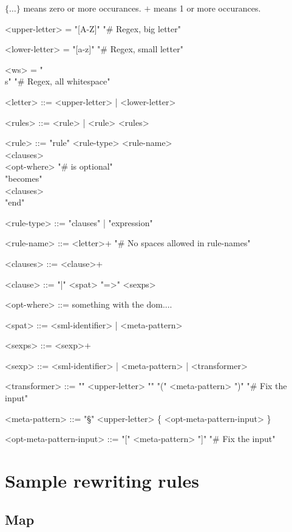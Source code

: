 \documentclass[oneside]{memoir}
\theoremstyle{definition}
\begin{document}
$\{ \ldots \}$ means zero or more occurances.
$+$ means 1 or more occurances.


\setlength{\grammarindent}{7.3em}
\begin{grammar} 
 
  <upper-letter> = "[A-Z]" \hfill "# Regex, big letter"

  <lower-letter> = "[a-z]" \hfill "# Regex, small letter"

  <ws> = "\\s" \hfill "\# Regex, all whitespace"

  <letter> ::= <upper-letter> | <lower-letter>

  <rules> ::= <rule> | <rule> <rules>

  <rule> ::= "rule" <rule-type> <rule-name> \\
             \hspace*{1em} <clauses> \\
             <opt-where> \hfill "\# is optional" \\
             "becomes" \\
             \hspace*{1em} <clauses> \\
             "end"

  <rule-type> ::= "clauses" | "expression" 

  <rule-name> ::= <letter>+ \hfill "\# No spaces allowed in rule-names"

  <clauses> ::= <clause>+

  <clause> ::= "|" <spat> "=>" <sexps>

  <opt-where> ::= something with the dom....

  <spat> ::= <sml-identifier> | <meta-pattern>

  <sexps>  ::= <sexp>+
  
  <sexp>   ::= <sml-identifier> | <meta-pattern> | <transformer>

  <transformer> ::= "{" <upper-letter> "}" "(" <meta-pattern> ")" \hfill "\# Fix the input"

  <meta-pattern> ::= "§" <upper-letter> \{ <opt-meta-pattern-input> \}

  <opt-meta-pattern-input> ::= "[" <meta-pattern> "]" \hfill "\# Fix the input"

\end{grammar}


\appendix

\chapter{Sample rewriting rules}

\section{Map}
\end{document}
